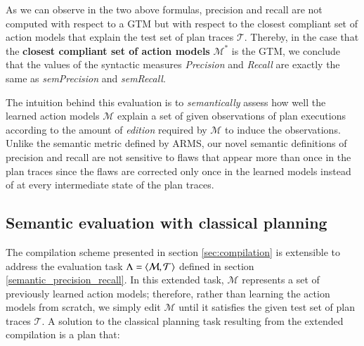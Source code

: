 As we can observe in the two above formulas, precision and recall are not computed with respect to a GTM but with respect to the closest compliant set of action models that explain the test set of plan traces $\mathcal{T}$. Thereby, in the case that the {\bf closest compliant set of action models} $\mathcal{M^*}$ is the GTM, we conclude that the values of the syntactic measures {\em Precision} and {\em Recall} are exactly the same as {\em sem\text{-}Precision} and {\em sem\text{-}Recall}.

The intuition behind this evaluation is to {\em semantically} assess how well the learned action models $\mathcal{M}$ explain a set of given observations of plan executions according to the amount of {\em edition} required by $\mathcal{M}$ to induce the observations. Unlike the semantic metric defined by ARMS, our novel semantic definitions of precision and recall are not sensitive to flaws that appear more than once in the plan traces since the flaws are corrected only once in the learned models instead of at every intermediate state of the plan traces.



\subsection{Semantic evaluation with classical planning}
\label{edit_distance}


The compilation scheme presented in section \ref{sec:compilation} is extensible to address the evaluation task $\Lambda={\langle \mathcal{M}, \mathcal{T} \rangle}$ defined in section \ref{semantic_precision_recall}. In this extended task, $\mathcal{M}$ represents a set of previously learned action models; therefore, rather than learning the action models from scratch, we simply edit $\mathcal{M}$ until it satisfies the given test set of plan traces $\mathcal{T}$. A solution to the classical planning task resulting from the extended compilation is a plan that:

